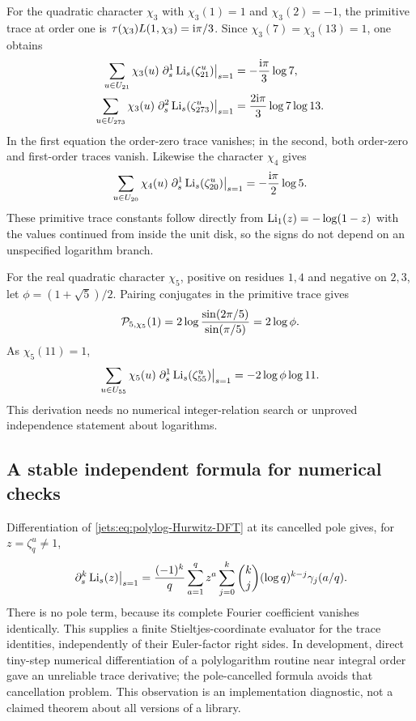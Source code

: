 For the quadratic character $\chi_3$ with $\chi_3(1)=1$ and
$\chi_3(2)=-1$, the primitive trace at order one is
$\tau(\chi_3)L(1,\chi_3)=\mathrm{i}\pi/3$. Since
$\chi_3(7)=\chi_3(13)=1$, one obtains
\begin{align}
 \sum_{u\in U_{21}}\chi_3(u)\left.\partial_s^{1}\operatorname{Li}_s(\zeta_{21}^u)\right|_{s=1}
 &=-\frac{\mathrm{i}\pi}{3}\log7,\label{jets:eq:chi3-21}\\
 \sum_{u\in U_{273}}\chi_3(u)\left.\partial_s^{2}\operatorname{Li}_s(\zeta_{273}^u)\right|_{s=1}
 &=\frac{2\mathrm{i}\pi}{3}\log7\log13.\label{jets:eq:chi3-273}
\end{align}
In the first equation the order-zero trace vanishes; in the second,
both order-zero and first-order traces vanish.
Likewise the character $\chi_4$ gives
\begin{equation}\label{jets:eq:chi4-20}
 \sum_{u\in U_{20}}\chi_4(u)\left.\partial_s^{1}\operatorname{Li}_s(\zeta_{20}^u)\right|_{s=1}
 =-\frac{\mathrm{i}\pi}{2}\log5.
\end{equation}
These primitive trace constants follow directly from
$\operatorname{Li}_1(z)=-\log(1-z)$ with the values continued from inside the unit
disk, so the signs do not depend on an unspecified logarithm branch.

For the real quadratic character $\chi_5$, positive on residues
$1,4$ and negative on $2,3$, let $\phi=(1+\sqrt5)/2$.
Pairing conjugates in the primitive trace gives
\[
 \mathcal P_{5,\chi_5}(1)
 =2\log\frac{\sin(2\pi/5)}{\sin(\pi/5)}=2\log\phi.
\]
As $\chi_5(11)=1$,
\begin{equation}\label{jets:eq:chi5-55}
 \sum_{u\in U_{55}}\chi_5(u)\left.\partial_s^{1}\operatorname{Li}_s(\zeta_{55}^u)\right|_{s=1}
 =-2\log\phi\log11.
\end{equation}
This derivation needs no numerical integer-relation search or
unproved independence statement about logarithms.

\subsection{A stable independent formula for numerical checks}
Differentiation of \eqref{jets:eq:polylog-Hurwitz-DFT} at its cancelled pole
gives, for $z=\zeta_q^u\ne1$,
\begin{equation}\label{jets:eq:stable-polylog-jet}
 \left.\partial_s^{k}\operatorname{Li}_s(z)\right|_{s=1}
 =\frac{(-1)^k}{q}\sum_{a=1}^q z^a
 \sum_{j=0}^k\binom kj(\log q)^{k-j}\gamma_j(a/q).
\end{equation}
There is no pole term, because its complete Fourier coefficient
vanishes identically. This supplies a finite Stieltjes-coordinate
evaluator for the trace identities, independently of their
Euler-factor right sides. In development, direct tiny-step numerical
differentiation of a polylogarithm routine near integral order gave
an unreliable trace derivative; the pole-cancelled formula avoids
that cancellation problem. This observation is an implementation
diagnostic, not a claimed theorem about all versions of a library.

